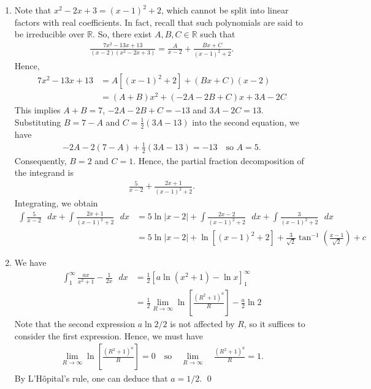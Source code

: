 \documentclass[12pt]{article}
\begin{document}
\begin{enumerate}[label=\textbf{(\alph*)}]
    \itemsep 0em
    \item Note that $x^2-2x+3=\left(x-1\right)^2+2$, which cannot be split into linear factors with real coefficients. In fact, recall that such polynomials are said to be irreducible over $\mathbb{R}$. So, there exist $A,B,C\in\mathbb{R}$ such that \begin{align*}
        \frac{7x^2-13x+13}{\left(x-2\right)\left(x^2-2x+3\right)}=\frac{A}{x-2}+\frac{Bx+C}{\left(x-1\right)^2+2}.
    \end{align*}
    Hence, \begin{align*}
        7x^2-13x+13&=A\left[\left(x-1\right)^2+2\right]+\left(Bx+C\right)\left(x-2\right)\\
        &=\left(A+B\right)x^2+\left(-2A-2B+C\right)x+3A-2C
    \end{align*}
    This implies $A+B=7$, $-2A-2B+C=-13$ and $3A-2C=13$. Substituting $B=7-A$ and $C=\frac{1}{2}\left(3A-13\right)$ into the second equation, we have \begin{align*}
        -2A-2\left(7-A\right)+\frac{1}{2}\left(3A-13\right)=-13\quad\text{so }A=5.
    \end{align*}
    Consequently, $B=2$ and $C=1$. Hence, the partial fraction decomposition of the integrand is \begin{align*}
        \frac{5}{x-2}+\frac{2x+1}{\left(x-1\right)^2+2}.
    \end{align*}
    Integrating, we obtain 
    \begin{align*}
        \int\frac{5}{x-2}\text{ }dx+\int\frac{2x+1}{\left(x-1\right)^2+2}\text{ }dx&=5\operatorname{ln}\left|x-2\right|+\int\frac{2x-2}{\left(x-1\right)^2+2}\text{ }dx+\int\frac{3}{\left(x-1\right)^2+2}\text{ }dx\\
        &=5\operatorname{ln}\left|x-2\right|+\operatorname{ln}\left[\left(x-1\right)^2+2\right]+\frac{3}{\sqrt{2}}\operatorname{tan}^{-1}\left(\frac{x-1}{\sqrt{2}}\right)+c
    \end{align*}
    \item We have 
    \begin{align*}
        \int_{1}^{\infty}\frac{ax}{x^2+1}-\frac{1}{2x}\text{ }dx&=\frac{1}{2}\left[a\operatorname{ln}\left(x^2+1\right)-\operatorname{ln}x\right]_{1}^{\infty}\\
        &=\frac{1}{2}\lim_{R\rightarrow\infty}\operatorname{ln}\left[\frac{\left(R^2+1\right)^a}{R}\right]-\frac{a}{2}\operatorname{ln}2
    \end{align*}
    Note that the second expression $a\operatorname{ln}2/2$ is not affected by $R$, so it suffices to consider the first expression. Hence, we must have \begin{align*}
        \lim_{R\rightarrow\infty}\operatorname{ln}\left[\frac{\left(R^2+1\right)^a}{R}\right]=0\quad\text{so}\quad\lim_{R\rightarrow\infty}\quad \frac{\left(R^2+1\right)^a}{R}=1.
    \end{align*}
    By L'Hôpital's rule, one can deduce that $a=1/2$. \qed 
\end{enumerate}
\end{document}
